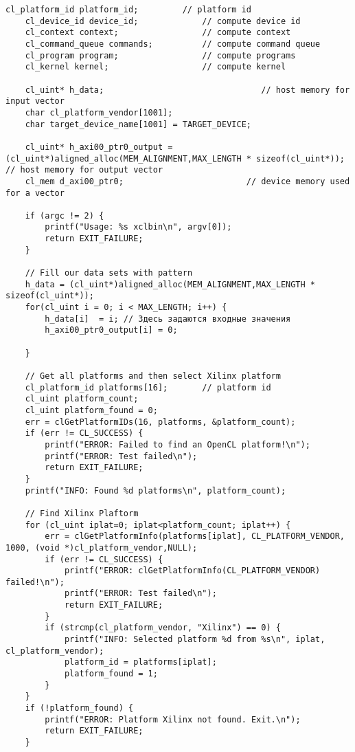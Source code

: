 \begin{lstlisting}[label=code:hostexample3, caption=Содержимое файла host\_example.cpp, basicstyle=\tiny]
    cl_platform_id platform_id;         // platform id
    cl_device_id device_id;             // compute device id
    cl_context context;                 // compute context
    cl_command_queue commands;          // compute command queue
    cl_program program;                 // compute programs
    cl_kernel kernel;                   // compute kernel

    cl_uint* h_data;                                // host memory for input vector
    char cl_platform_vendor[1001];
    char target_device_name[1001] = TARGET_DEVICE;

    cl_uint* h_axi00_ptr0_output = (cl_uint*)aligned_alloc(MEM_ALIGNMENT,MAX_LENGTH * sizeof(cl_uint*)); // host memory for output vector
    cl_mem d_axi00_ptr0;                         // device memory used for a vector

    if (argc != 2) {
        printf("Usage: %s xclbin\n", argv[0]);
        return EXIT_FAILURE;
    }

    // Fill our data sets with pattern
    h_data = (cl_uint*)aligned_alloc(MEM_ALIGNMENT,MAX_LENGTH * sizeof(cl_uint*));
    for(cl_uint i = 0; i < MAX_LENGTH; i++) {
        h_data[i]  = i; // Здесь задаются входные значения
        h_axi00_ptr0_output[i] = 0; 

    }

    // Get all platforms and then select Xilinx platform
    cl_platform_id platforms[16];       // platform id
    cl_uint platform_count;
    cl_uint platform_found = 0;
    err = clGetPlatformIDs(16, platforms, &platform_count);
    if (err != CL_SUCCESS) {
        printf("ERROR: Failed to find an OpenCL platform!\n");
        printf("ERROR: Test failed\n");
        return EXIT_FAILURE;
    }
    printf("INFO: Found %d platforms\n", platform_count);

    // Find Xilinx Plaftorm
    for (cl_uint iplat=0; iplat<platform_count; iplat++) {
        err = clGetPlatformInfo(platforms[iplat], CL_PLATFORM_VENDOR, 1000, (void *)cl_platform_vendor,NULL);
        if (err != CL_SUCCESS) {
            printf("ERROR: clGetPlatformInfo(CL_PLATFORM_VENDOR) failed!\n");
            printf("ERROR: Test failed\n");
            return EXIT_FAILURE;
        }
        if (strcmp(cl_platform_vendor, "Xilinx") == 0) {
            printf("INFO: Selected platform %d from %s\n", iplat, cl_platform_vendor);
            platform_id = platforms[iplat];
            platform_found = 1;
        }
    }
    if (!platform_found) {
        printf("ERROR: Platform Xilinx not found. Exit.\n");
        return EXIT_FAILURE;
    }


\end{lstlisting}
